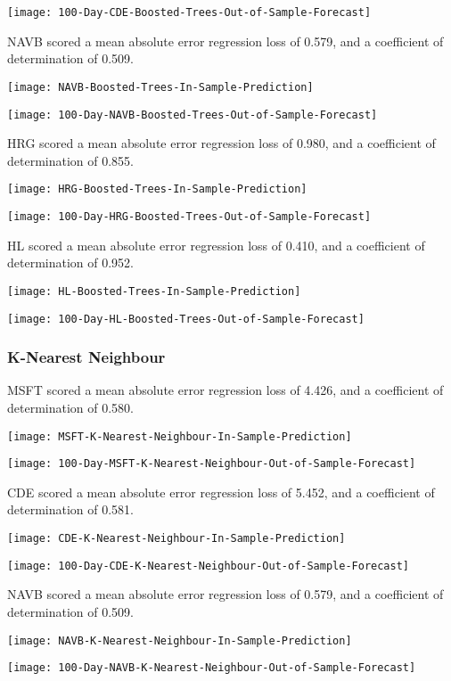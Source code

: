 \texttt{[image: 100-Day-CDE-Boosted-Trees-Out-of-Sample-Forecast]}

NAVB scored a mean absolute error regression loss of 0.579, and a coefficient of determination of 0.509.

\texttt{[image: NAVB-Boosted-Trees-In-Sample-Prediction]}

\texttt{[image: 100-Day-NAVB-Boosted-Trees-Out-of-Sample-Forecast]}

HRG scored a mean absolute error regression loss of 0.980, and a coefficient of determination of 0.855.

\texttt{[image: HRG-Boosted-Trees-In-Sample-Prediction]}

\texttt{[image: 100-Day-HRG-Boosted-Trees-Out-of-Sample-Forecast]}

HL scored a mean absolute error regression loss of 0.410, and a coefficient of determination of 0.952.

\texttt{[image: HL-Boosted-Trees-In-Sample-Prediction]}

\texttt{[image: 100-Day-HL-Boosted-Trees-Out-of-Sample-Forecast]}

\subsubsection{K-Nearest Neighbour}
MSFT scored a mean absolute error regression loss of 4.426, and a coefficient of determination of 0.580.

\texttt{[image: MSFT-K-Nearest-Neighbour-In-Sample-Prediction]}

\texttt{[image: 100-Day-MSFT-K-Nearest-Neighbour-Out-of-Sample-Forecast]}

CDE scored a mean absolute error regression loss of 5.452, and a coefficient of determination of 0.581.

\texttt{[image: CDE-K-Nearest-Neighbour-In-Sample-Prediction]}

\texttt{[image: 100-Day-CDE-K-Nearest-Neighbour-Out-of-Sample-Forecast]}

NAVB scored a mean absolute error regression loss of 0.579, and a coefficient of determination of 0.509.

\texttt{[image: NAVB-K-Nearest-Neighbour-In-Sample-Prediction]}

\texttt{[image: 100-Day-NAVB-K-Nearest-Neighbour-Out-of-Sample-Forecast]}

